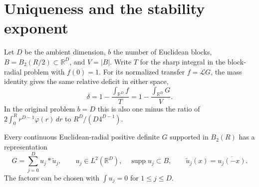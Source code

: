 \documentclass[11pt,a4paper]{article}
\numberwithin{equation}{section}
\begin{document}
\section{Uniqueness and the stability exponent}
\label{sec:sharp-stability}
Let $D$ be the ambient dimension, $b$ the number of Euclidean blocks,
$B=B_2(R/2)\subset\mathbb R^D$, and $V=|B|$. Write $T$ for the sharp
integral in the block-radial problem with $f(0)=1$. For its normalized
transfer $f=\mathcal L G$, the mass identity gives the same relative deficit
in either space,
\begin{equation}
 \delta=1-\frac{\int_{\mathbb R^D}f}{T}
        =1-\frac{\int_{\mathbb R^D}G}{V}.
 \label{eq:stability-deficit}
\end{equation}
In the original problem $b=D$ this is also one minus the ratio of
$2\int_0^R r^{D-1}\varphi(r)\,dr$ to $R^D/(D4^{D-1})$.

\begin{lemma}\label{lem:half-ball-factors}
Every continuous Euclidean-radial positive definite $G$ supported in
$B_2(R)$ has a representation
\[
 G=\sum_{j=0}^D u_j*\widetilde u_j,\qquad
 u_j\in L^2(\mathbb R^D),\quad \operatorname{supp}u_j\subset B,
 \qquad \widetilde u_j(x)=\overline{u_j(-x)}.
\]
The factors can be chosen with $\int u_j=0$ for $1\le j\le D$.
\end{lemma}
\end{document}
